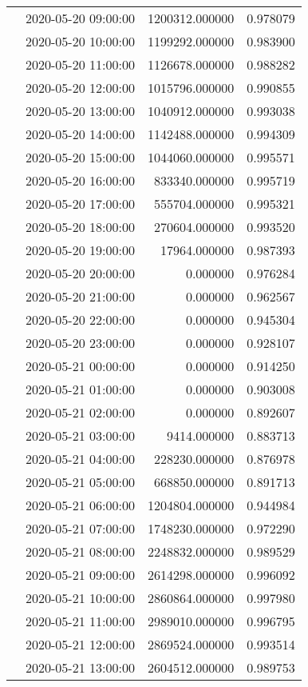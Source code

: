 \begin{tabular}{llrr}
 & 2020-05-20 09:00:00 & 1200312.000000 & 0.978079 \\
 & 2020-05-20 10:00:00 & 1199292.000000 & 0.983900 \\
 & 2020-05-20 11:00:00 & 1126678.000000 & 0.988282 \\
 & 2020-05-20 12:00:00 & 1015796.000000 & 0.990855 \\
 & 2020-05-20 13:00:00 & 1040912.000000 & 0.993038 \\
 & 2020-05-20 14:00:00 & 1142488.000000 & 0.994309 \\
 & 2020-05-20 15:00:00 & 1044060.000000 & 0.995571 \\
 & 2020-05-20 16:00:00 & 833340.000000 & 0.995719 \\
 & 2020-05-20 17:00:00 & 555704.000000 & 0.995321 \\
 & 2020-05-20 18:00:00 & 270604.000000 & 0.993520 \\
 & 2020-05-20 19:00:00 & 17964.000000 & 0.987393 \\
 & 2020-05-20 20:00:00 & 0.000000 & 0.976284 \\
 & 2020-05-20 21:00:00 & 0.000000 & 0.962567 \\
 & 2020-05-20 22:00:00 & 0.000000 & 0.945304 \\
 & 2020-05-20 23:00:00 & 0.000000 & 0.928107 \\
 & 2020-05-21 00:00:00 & 0.000000 & 0.914250 \\
 & 2020-05-21 01:00:00 & 0.000000 & 0.903008 \\
 & 2020-05-21 02:00:00 & 0.000000 & 0.892607 \\
 & 2020-05-21 03:00:00 & 9414.000000 & 0.883713 \\
 & 2020-05-21 04:00:00 & 228230.000000 & 0.876978 \\
 & 2020-05-21 05:00:00 & 668850.000000 & 0.891713 \\
 & 2020-05-21 06:00:00 & 1204804.000000 & 0.944984 \\
 & 2020-05-21 07:00:00 & 1748230.000000 & 0.972290 \\
 & 2020-05-21 08:00:00 & 2248832.000000 & 0.989529 \\
 & 2020-05-21 09:00:00 & 2614298.000000 & 0.996092 \\
 & 2020-05-21 10:00:00 & 2860864.000000 & 0.997980 \\
 & 2020-05-21 11:00:00 & 2989010.000000 & 0.996795 \\
 & 2020-05-21 12:00:00 & 2869524.000000 & 0.993514 \\
 & 2020-05-21 13:00:00 & 2604512.000000 & 0.989753 \\

\end{tabular}

